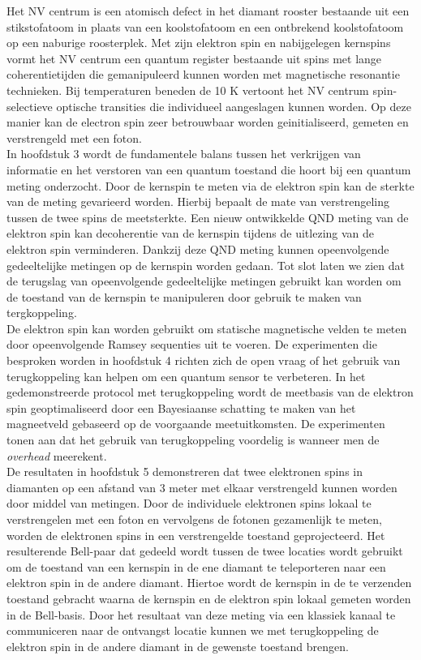 Het NV centrum is een atomisch defect in het diamant rooster bestaande uit een stikstofatoom in plaats van een koolstofatoom en een ontbrekend koolstofatoom op een naburige roosterplek. Met zijn elektron spin en nabijgelegen kernspins vormt het NV centrum een quantum register bestaande uit spins met lange coherentietijden die gemanipuleerd kunnen worden met magnetische resonantie technieken. Bij temperaturen beneden de 10 K vertoont het NV centrum spin-selectieve optische transities die individueel aangeslagen kunnen worden. Op deze manier kan de electron spin zeer betrouwbaar worden geinitialiseerd, gemeten en verstrengeld met een foton. \\

In hoofdstuk 3 wordt de fundamentele balans tussen het verkrijgen van informatie en het verstoren van een quantum toestand die hoort bij een quantum meting onderzocht. Door de kernspin te meten via de elektron spin kan de sterkte van de meting gevarieerd worden. Hierbij bepaalt de mate van verstrengeling tussen de twee spins de meetsterkte. Een nieuw ontwikkelde QND meting van de elektron spin kan decoherentie van de kernspin tijdens de uitlezing van de elektron spin verminderen. Dankzij deze QND meting kunnen opeenvolgende gedeeltelijke metingen op de kernspin worden gedaan. Tot slot laten we zien dat de terugslag van opeenvolgende gedeeltelijke metingen gebruikt kan worden om de toestand van de kernspin te manipuleren door gebruik te maken van tergkoppeling.\\

De elektron spin kan worden gebruikt om statische magnetische velden te meten door opeenvolgende Ramsey sequenties uit te voeren. De experimenten die besproken worden in hoofdstuk 4 richten zich de open vraag of het gebruik van terugkoppeling kan helpen om een quantum sensor te verbeteren. In het gedemonstreerde protocol met terugkoppeling wordt de meetbasis van de elektron spin geoptimaliseerd door een Bayesiaanse schatting te maken van het magneetveld gebaseerd op de voorgaande meetuitkomsten. De experimenten tonen aan dat het gebruik van terugkoppeling voordelig is wanneer men de \textit{overhead} meerekent.\\

De resultaten in hoofdstuk 5 demonstreren dat twee elektronen spins in diamanten op een afstand van 3 meter met elkaar verstrengeld kunnen worden door middel van metingen. Door de individuele elektronen spins lokaal te verstrengelen met een foton en vervolgens de fotonen gezamenlijk te meten, worden de elektronen spins in een verstrengelde toestand geprojecteerd. Het resulterende Bell-paar dat gedeeld wordt tussen de twee locaties wordt gebruikt om de toestand van een kernspin in de ene diamant te teleporteren naar een elektron spin in de andere diamant. Hiertoe wordt de kernspin in de te verzenden toestand gebracht waarna de kernspin en de elektron spin lokaal gemeten worden in de Bell-basis. Door het resultaat van deze meting via een klassiek kanaal te communiceren naar de ontvangst locatie kunnen we met terugkoppeling de elektron spin in de andere diamant in de gewenste toestand brengen. \\

